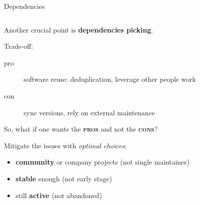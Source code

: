 \documentclass[9pt]{beamer}
\begin{document}
\begin{frame}{Dependencies}
    \vspace*{20pt}
    \begin{columns}
        \begin{column}{0.5\textwidth}
            Another crucial point is \textbf{dependencies picking}.
            \vspace*{10pt}

            Trade-off:
            \begin{description}
                \item[pro] software reuse: deduplication, leverage other people work
                \item[con] sync versions, rely on external maintenance
            \end{description}
            \vspace*{20pt}

            So, what if one wants the \textbf{\textsc{pros}} and not the
            \textbf{\textsc{cons}}?

            Mitigate the issues with \textit{optimal choices}:
            \begin{itemize}
                \item \alert{\textbf{community}} or company projects (not
                  single maintainer)
                \item \alert{\textbf{stable}} enough (not early stage)
                \item still \alert{\textbf{active}} (not abandoned)
            \end{itemize}
            \vspace*{10pt}


\end{column}
\end{columns}
\end{frame}
\end{document}
